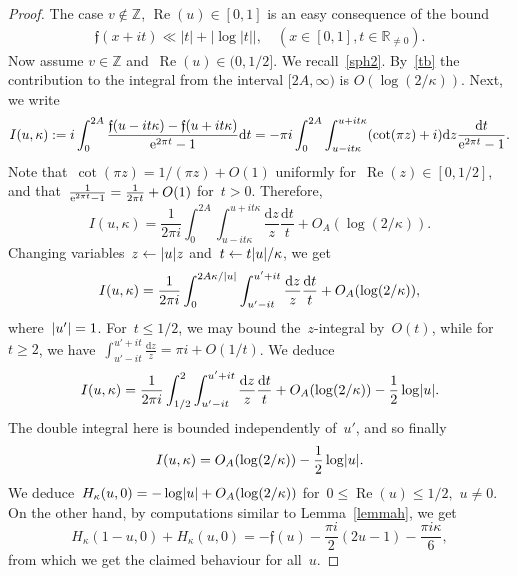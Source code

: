 \documentclass[11pt]{amsart}
\newcommand{\R}{\mathbb{R}}
\newcommand{\Z}{\mathbb{Z}}
\newcommand{\lf}{{\mathfrak f}}
\theoremstyle{definition}
\newcommand{\pr}[1]{\mathchoice{\left( #1\right)}{(#1)}{(#1)}{(#1)}}
\newcommand{\e}[1][]{\ifthenelse{\equal{#1}{}}{{\rm e}}{\operatorname{e}\pr{ #1}}}
\newcommand{\df}{\mathrm{d}}
\renewcommand\Re{\operatorname{Re}}
\newcommand{\1}{{\mathbf 1}}
\newcommand{\abs}[1]{\left|#1\right|}
\let\originalleft\left
\let\originalright\right
\renewcommand{\left}{\mathopen{}\mathclose\bgroup\originalleft}
\renewcommand{\right}{\aftergroup\egroup\originalright}
\numberwithin{equation}{section}
\begin{document}
\begin{proof}
  The case $v\notin\Z$, $\Re(u)\in [0,1]$ 
   is an easy consequence of the bound 
  \begin{align}\label{tb}
    \lf(x+it)\ll |t| +|\log |t||,\quad  (x\in[0, 1], t\in\R_{\neq 0}).
  \end{align}
  Now assume $v\in\Z$ and~$\Re(u)\in(0, 1/2]$. We recall~\eqref{sph2}. By~\eqref{tb} the contribution to the integral from the interval $[2A,\infty)$ is $O(\log(2/\kappa))$. Next, we write
  $$ I(u, \kappa) := i\int_{0}^{2A} \frac{\lf(u - it\kappa)-\lf(u + it \kappa)}{\e^{2\pi t}-1}\df{t} = -\pi i\int_0^{2A} \int_{u-it\kappa}^{u+it\kappa} (\cot(\pi z)+i)\df z \frac{\df t}{\e^{2\pi t}-1}. $$
  Note that~$\cot(\pi z)  = 1/(\pi z) + O(1)$ uniformly for~$\Re(z)\in[0, 1/2]$, and that~$\frac1{\e^{2\pi t}-1} = \frac1{2\pi t} + O(1)$ for~$t>0$. Therefore,
  $$ I(u, \kappa) = \frac{1}{2\pi i}\int_0^{2A} \int_{u-it\kappa}^{u+it\kappa} \frac{\df z}z \frac{\df t}{t} + O_A(\log(2/\kappa)). $$
  Changing variables~$z \gets \abs{u} z$ and~$t\gets t\abs{u}/\kappa$, we get
  $$ I(u, \kappa) = \frac{1}{2\pi i}\int_0^{2A \kappa / \abs{u}} \int_{u'-it}^{u'+it} \frac{\df z}z \frac{\df t}{t} + O_A(\log(2/\kappa)), $$
  where~$\abs{u'}=1$. For~$t\leq 1/2$, we may bound the~$z$-integral by~$O(t)$, while
  for~$t\geq 2$, we have~$\int_{u'-it}^{u'+it} \frac{\df z}z = \pi i + O(1/t)$. We deduce
  $$ I(u, \kappa) = \frac{1}{2\pi i}\int_{1/2}^{2} \int_{u'-it}^{u'+it} \frac{\df z}z \frac{\df t}{t} + O_A(\log(2/\kappa)) - \frac12\log\abs{u}. $$
  The double integral here is bounded independently of~$u'$, and so finally
  $$ I(u, \kappa) = O_A(\log(2/\kappa)) - \frac12\log\abs{u}. $$
  We deduce~$H_\kappa(u, 0) = -\log\abs{u} + O_A(\log(2/\kappa))$ for~$0\leq\Re(u)\leq 1/2,$ $u\neq0$. On the other hand, by computations similar to Lemma~\ref{lemmah}, we get
  $$ H_\kappa(1-u, 0) + H_\kappa(u, 0) = -\lf(u) - \frac{\pi i}2 (2u-1) - \frac{\pi i \kappa}{6}, $$
  from which we get the claimed behaviour for all~$u$.
\end{proof}
\end{document}
